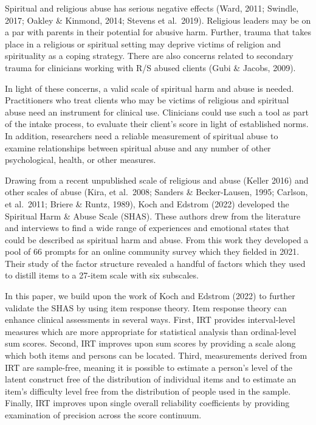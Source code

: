 \documentclass[
  letterpaper,
  DIV=11,
  numbers=noendperiod]{scrreport}
\begin{document}
Spiritual and religious abuse has serious negative effects (Ward, 2011;
Swindle, 2017; Oakley \& Kinmond, 2014; Stevens et al.~2019). Religious
leaders may be on a par with parents in their potential for abusive
harm. Further, trauma that takes place in a religious or spiritual
setting may deprive victims of religion and spirituality as a coping
strategy. There are also concerns related to secondary trauma for
clinicians working with R/S abused clients (Gubi \& Jacobs, 2009).

In light of these concerns, a valid scale of spiritual harm and abuse is
needed. Practitioners who treat clients who may be victims of religious
and spiritual abuse need an instrument for clinical use. Clinicians
could use such a tool as part of the intake process, to evaluate their
client's score in light of established norms. In addition, researchers
need a reliable measurement of spiritual abuse to examine relationships
between spiritual abuse and any number of other psychological, health,
or other measures.

Drawing from a recent unpublished scale of religious and abuse (Keller
2016) and other scales of abuse (Kira, et al.~2008; Sanders \&
Becker-Lausen, 1995; Carlson, et al.~2011; Briere \& Runtz, 1989), Koch
and Edstrom (2022) developed the Spiritual Harm \& Abuse Scale (SHAS).
These authors drew from the literature and interviews to find a wide
range of experiences and emotional states that could be described as
spiritual harm and abuse. From this work they developed a pool of 66
prompts for an online community survey which they fielded in 2021. Their
study of the factor structure revealed a handful of factors which they
used to distill items to a 27-item scale with six subscales.

In this paper, we build upon the work of Koch and Edstrom (2022) to
further validate the SHAS by using item response theory. Item response
theory can enhance clinical assessments in several ways. First, IRT
provides interval-level measures which are more appropriate for
statistical analysis than ordinal-level sum scores. Second, IRT improves
upon sum scores by providing a scale along which both items and persons
can be located. Third, measurements derived from IRT are sample-free,
meaning it is possible to estimate a person's level of the latent
construct free of the distribution of individual items and to estimate
an item's difficulty level free from the distribution of people used in
the sample. Finally, IRT improves upon single overall reliability
coefficients by providing examination of precision across the score
continuum.
\end{document}
